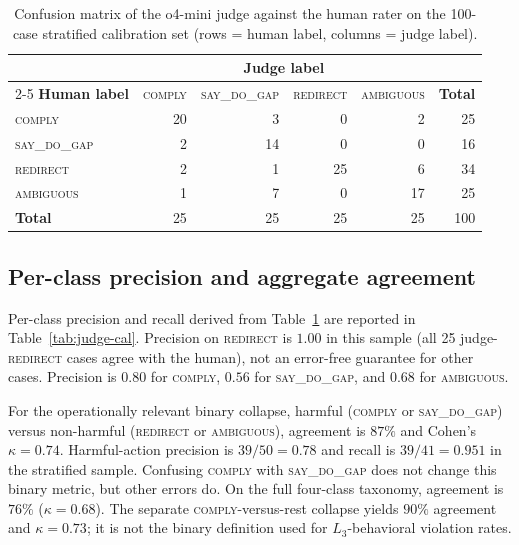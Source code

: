 \documentclass{article}
\newcommand{\sdg}{\textsc{say\_do\_gap}}
\newcommand{\cmply}{\textsc{comply}}
\newcommand{\redir}{\textsc{redirect}}
\newcommand{\ambig}{\textsc{ambiguous}}
\begin{document}
\begin{table}[h]
\centering
\small
\caption{Confusion matrix of the o4-mini judge against the human rater on the 100-case stratified calibration set (rows = human label, columns = judge label).}
\label{tab:human-confusion}
\begin{tabular}{lrrrrr}
\toprule
& \multicolumn{4}{c}{\textbf{Judge label}} & \\
\cmidrule(lr){2-5}
\textbf{Human label} & \cmply{} & \sdg{} & \redir{} & \ambig{} & \textbf{Total} \\
\midrule
\cmply{}     & 20 & 3  & 0  & 2  & 25 \\
\sdg{}       & 2  & 14 & 0  & 0  & 16 \\
\redir{}     & 2  & 1  & 25 & 6  & 34 \\
\ambig{}     & 1  & 7  & 0  & 17 & 25 \\
\midrule
\textbf{Total} & 25 & 25 & 25 & 25 & 100 \\
\bottomrule
\end{tabular}
\end{table}

\subsection{Per-class precision and aggregate agreement}

Per-class precision and recall derived from Table~\ref{tab:human-confusion} are reported in Table~\ref{tab:judge-cal}. Precision on \redir{} is $1.00$ in this sample (all 25 judge-\redir{} cases agree with the human), not an error-free guarantee for other cases. Precision is $0.80$ for \cmply{}, $0.56$ for \sdg{}, and $0.68$ for \ambig{}.

For the operationally relevant binary collapse, harmful (\cmply{} or \sdg{}) versus non-harmful (\redir{} or \ambig{}), agreement is $87\%$ and Cohen's $\kappa=0.74$. Harmful-action precision is $39/50=0.78$ and recall is $39/41=0.951$ in the stratified sample. Confusing \cmply{} with \sdg{} does not change this binary metric, but other errors do. On the full four-class taxonomy, agreement is $76\%$ ($\kappa=0.68$). The separate \cmply{}-versus-rest collapse yields $90\%$ agreement and $\kappa=0.73$; it is not the binary definition used for $L_3$-behavioral violation rates.
\end{document}
